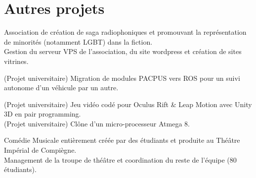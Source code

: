 \documentclass[]{cv-template}
\begin{document}
\begin{minipage}[t]{0.65\textwidth}


\section{Autres projets}
Association de création de saga radiophoniques et promouvant la représentation de minorités (notamment LGBT) dans la fiction.\\
Gestion du serveur VPS de l'association, du site wordpress et création de sites vitrines.

(Projet universitaire) Migration de modules PACPUS vers ROS pour un suivi autonome d'un véhicule par un autre.


(Projet universitaire) Jeu vidéo codé pour Oculus Rift \& Leap Motion avec Unity 3D en pair programming. \\

(Projet universitaire) Clône d'un micro-processeur Atmega 8.

Comédie Musicale entièrement créée par des étudiants et produite au Théâtre Impérial de Compiègne. \\
Management de la troupe de théâtre et coordination du reste de l'équipe (80 étudiants).








\sectionsep 

\end{minipage} 
\end{document}
